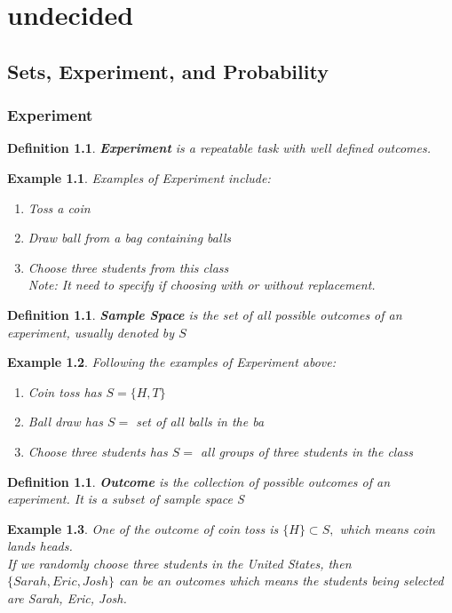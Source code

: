 \documentclass[11pt,oneside]{book}
\theoremstyle{newStyle}
\newtheorem{defn}[thm]{Definition}
\newtheorem{ex}{Example}[section]
\begin{document}
\newpage

\tableofcontents
{}

\vspace*{\fill}

\newpage
\chapter[undecided]{undecided}
\section{Sets, Experiment, and Probability}
\subsection[Experiment]{Experiment}
\begin{defn}
\textbf{Experiment} is a repeatable task with well defined outcomes.
\end{defn}

\begin{ex}
Examples of Experiment include:
\begin{enumerate}[itemsep=0pt, topsep=1pt, partopsep=0pt,label=(\alph*)]
\item Toss a coin
\item Draw ball from a bag containing balls
\item Choose three students from this class \\
\color{red}Note: It need to specify if choosing with or without replacement.
\end{enumerate}
\end{ex}
\begin{defn}
\textbf{Sample Space} is the set of all possible outcomes of an experiment, usually denoted by $S$
\end{defn}
\begin{ex}
Following the examples of Experiment above:
\begin{enumerate}[itemsep=0pt, topsep=1pt, partopsep=0pt,label=(\alph*)]
\item Coin toss has $S=\{H,T\}$
\item Ball draw has $S=$ set of all balls in the ba
\item Choose three students has $S=$ all groups of three students in the class
\end{enumerate}
\end{ex}
\begin{defn}
\textbf{Outcome} is the collection of possible outcomes of an experiment. It is a subset of sample space S
\end{defn}
\begin{ex}
One of the outcome of coin toss is $\{H\}\subset S,$ which means coin lands heads.\\
If we randomly choose three students in the United States, then $\{Sarah,Eric,Josh\}$ can be an outcomes which means the students being selected are Sarah, Eric, Josh.\\
\end{ex}
\end{document}
